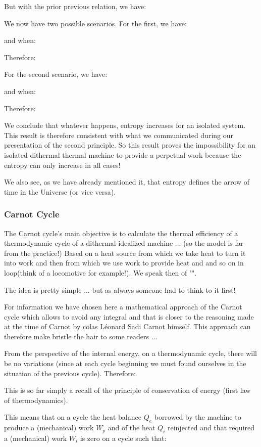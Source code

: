 	But with the prior previous relation, we have:
	
	We now have two possible scenarios. For the first, we have:
	
	and when:
	
	Therefore:
	
	For the second scenario, we have:
	
	and when:
	
	Therefore:
	
	We conclude that whatever happens, entropy increases for an isolated system. This result is therefore consistent with what we communicated during our presentation of the second principle. So this result proves the impossibility for an isolated dithermal thermal machine to provide a perpetual work because the entropy can only increase in all cases!

	We also see, as we have already mentioned it, that entropy defines the arrow of time in the Universe (or vice versa).
	
	\subsubsection{Carnot Cycle}
	The Carnot cycle's main objective is to calculate the thermal efficiency of a thermodynamic cycle of a dithermal idealized machine ... (so the model is far from the practice!) Based on a heat source from which we take heat to turn it into work and then from which we use work to provide heat and and so on in loop(think of a locomotive for example!). We speak then of "".

	The idea is pretty simple ... but as always someone had to think to it first! 

	For information we have chosen here a mathematical approach of the Carnot cycle which allows to avoid any integral and that is closer to the reasoning made at the time of Carnot by colas Léonard Sadi Carnot himself. This approach can therefore make bristle the hair to some readers ...

	From the perspective of the internal energy, on a thermodynamic cycle, there will be no variations (since at each cycle beginning we must found ourselves in the situation of the previous cycle). Therefore:
	
	This is so far simply a recall of the principle of conservation of energy (first law of thermodynamics).

	This means that on a cycle the heat balance $Q_e$ borrowed by the machine to produce a (mechanical) work $W_p$  and  of the heat $Q_i$ reinjected and that required a (mechanical)  work $W_i$ is zero on a cycle such that:
	
